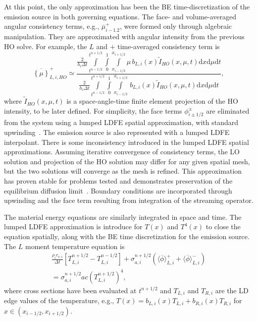 \documentclass{anstrans}
\newcommand{\mom}[1]{\langle #1 \rangle}
\newcommand{\xl}{{x_{i-1/2}}}
\newcommand{\xr}{{x_{i+1/2}}}
\newcommand{\dd}{\ensuremath{\mathrm{d}}}
\newcommand{\phibar}{\ensuremath{\overline{\phi}}}
\newcommand{\cur}[1]{\left\{ #1 \right\}}
\newcommand{\ds}[0]{\displaystyle}
\begin{document}
At this point, the only approximation has been the BE time-discretization of the emission source in
both governing equations. 
The face- and volume-averaged angular consistency terms, e.g., $\overline{\mu}_{i-1.2}^+$, were
formed only through algebraic manipulation.   They are approximated with angular intensity from the
previous HO solve.
For example, the $L$ and $+$ time-averaged consistency term is
\begin{equation}\label{eq:cons}
    \overline{\cur{{\mu}}}_{L,i,HO}^{+} \simeq  \frac{\ds 
        {\displaystyle \frac{2}{h_i\Delta t}} \int\limits_{t^{n-1/2}}^{t^{n+1/2}} \int\limits_0^1 \int\limits_\xl^\xr \mu \, b_{L,i}(x)
\tilde I_{HO}(x,\mu,t) \dd x \dd \mu \dd t } 
{\ds {\displaystyle \frac{2}{h_i \Delta t}}\int\limits_{t^{n-1/2}}^{t^{n+1/2}} \int\limits_0^1 \int\limits_\xl^\xr \, b_{L,i}(x)
\tilde I_{HO}(x,\mu,t) \dd x \dd \mu \dd t },
\end{equation}
where $\tilde I_{HO}(x,\mu,t)$ is a space-angle-time finite element projection of the HO intensity,
to be later defined.  For simplicity, the face terms $\phi_{i\pm1/2}^\pm$ are eliminated from the
system using a lumped LDFE spatial approximation, with standard upwinding~\cite{bolding_nse}.  The
emission source is also represented with a lumped LDFE interpolant. 
There is some inconsistency introduced in the lumped LDFE spatial approximations. Assuming
iterative convergence of consistency terms, the LO solution and projection of the HO solution may
differ for any given spatial mesh, but the two solutions will converge as the mesh is refined.  This
approximation has proven stable for problems tested and demonstrates preservation of the equilibrium diffusion
limit~\cite{dissertation}. Boundary conditions are incorporated through upwinding and the face term
resulting from integration of the streaming operator.

The material energy equations are similarly integrated in space and time.  
The lumped LDFE approximation is introduce for $T(x)$ and $T^4(x)$ to close the equation spatially, along
with the BE time discretization for the emission source.  The $L$ moment temperature equation is 
\begin{multline}\label{eq:Tt_moml_ex}
     \frac{\rho_i c_{v,i}}{\Delta t}\left[T_{L,i}^{n+1/2} - T_{L,i}^{n-1/2}\right]   + \sigma_{a,i}^{n+1/2} \left( \mom{\phibar}_{L,i}^+ +
    \mom{\phibar}_{L,i}^- \right) \\ = \sigma_{a,i}^{n+1/2}a c
\left( T_{L,i}^{n+1/2}\right)^4,
\end{multline}
where cross sections have been evaluated at $t^{n+1/2}$ and $T_{L,i}$ and $T_{R,i}$ are the LD edge
values of the temperature, e.g., $T(x)=b_{L,i}(x)T_{L,i}+b_{R,i}(x)T_{R,i}$ for
$x\in(\xl,\xr)$.  
\end{document}
